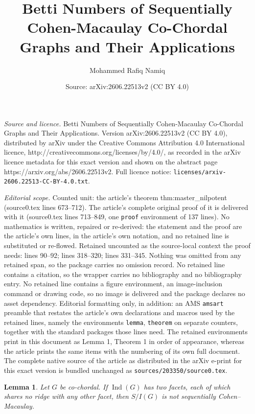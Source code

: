 \documentclass[10pt,a4paper]{amsart}
\title{Betti Numbers of Sequentially Cohen-Macaulay Co-Chordal Graphs and Their Applications}
\author{Mohammed Rafiq Namiq}
\date{Source: arXiv:2606.22513v2 (CC BY 4.0)}
\newtheorem{lemma}{Lemma}
\begin{document}
\maketitle

\noindent\emph{Source and licence.} Betti Numbers of Sequentially Cohen-Macaulay Co-Chordal Graphs and Their Applications. Version arXiv:2606.22513v2 (CC BY 4.0), distributed by arXiv under the Creative Commons Attribution 4.0 International licence, http://creativecommons.org/licenses/by/4.0/, as recorded in the arXiv licence metadata for this exact version and shown on the abstract page https://arxiv.org/abs/2606.22513v2. Full licence notice: \texttt{licenses/arxiv-2606.22513-CC-BY-4.0.txt}.\par\smallskip

\noindent\textit{Editorial scope.} Counted unit: the article's theorem thm:master\_nilpotent (source0.tex lines 673--712). The article's complete original proof of it is delivered with it (source0.tex lines 713--849, one \texttt{proof} environment of 137 lines). No mathematics is written, repaired or re-derived: the statement and the proof are the article's own lines, in the article's own notation, and no retained line is substituted or re-flowed.  Retained uncounted as the source-local context the proof needs: lines 90--92; lines 318--320; lines 331--345.  Nothing was omitted from any retained span, so the package carries no omission record.  No retained line contains a citation, so the wrapper carries no bibliography and no bibliography entry.  No retained line contains a figure environment, an image-inclusion command or drawing code, so no image is delivered and the package declares no asset dependency.  Editorial formatting only, in addition: an AMS \texttt{amsart} preamble that restates the article's own declarations and macros used by the retained lines, namely the environments \texttt{lemma}, \texttt{theorem} on separate counters, together with the standard packages those lines need.  The retained environments print in this document as Lemma 1, Theorem 1 in order of appearance, whereas the article prints the same items with the numbering of its own full document.  The complete native source of the article as distributed in the arXiv e-print for this exact version is bundled unchanged as \texttt{sources/203350/source0.tex}.
	\begin{lemma}\label{lem:ridge-obstruction}
Let $G$ be co-chordal.  If $\operatorname{Ind}(G)$ has two facets, each of which shares no ridge with any other facet, then $S/I(G)$ is not sequentially Cohen--Macaulay.
\end{lemma}
\end{document}
